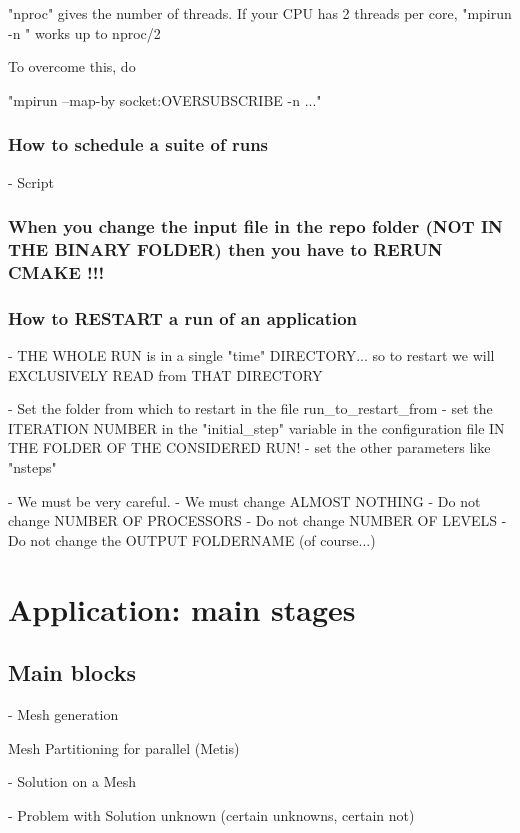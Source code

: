 \documentclass[10pt]{book}
\begin{document}
"nproc" gives the number of threads. If your CPU has 2 threads per core, "mpirun -n " works up to nproc/2

To overcome this, do

"mpirun --map-by socket:OVERSUBSCRIBE -n ..."


 \section{How to schedule a suite of runs}

- Script

 \section{When you change the input file in the repo folder (NOT IN THE BINARY FOLDER) then you have to RERUN CMAKE !!!}
 

 \section{How to RESTART a run of an application}
 
- THE WHOLE RUN is in a single "time" DIRECTORY...
  so to restart we will EXCLUSIVELY READ from THAT DIRECTORY

- Set the folder from which to restart in the file run\_to\_restart\_from
- set the ITERATION NUMBER in the "initial\_step" variable in the configuration file IN THE FOLDER OF THE CONSIDERED RUN!
- set the other parameters like "nsteps"

- We must be very careful.
- We must change ALMOST NOTHING
- Do not change NUMBER OF PROCESSORS
- Do not change NUMBER OF LEVELS
- Do not change the OUTPUT FOLDERNAME (of course...)



\part{Application: main stages}

  
   \chapter{Main blocks}


 
 - Mesh generation
 
   Mesh Partitioning for parallel (Metis)
 
 - Solution on a Mesh

 - Problem with Solution unknown (certain unknowns, certain not)
 
\end{document}

